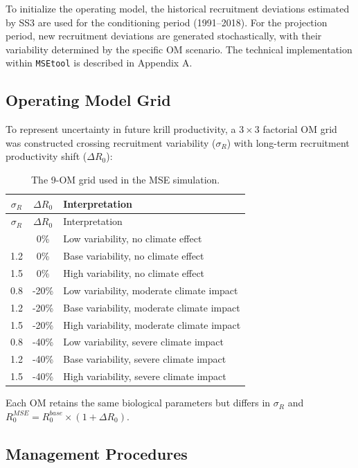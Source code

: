 \documentclass[
]{article}
\begin{document}
To initialize the operating model, the historical recruitment deviations estimated by SS3 are used for the conditioning period (1991--2018). For the projection period, new recruitment deviations are generated stochastically, with their variability determined by the specific OM scenario. The technical implementation within \texttt{MSEtool} is described in Appendix A.

\hypertarget{operating-model-grid}{%
\subsection{Operating Model Grid}\label{operating-model-grid}}

To represent uncertainty in future krill productivity, a \(3 \times 3\) factorial OM grid was constructed crossing recruitment variability (\(\sigma_R\)) with long-term recruitment productivity shift (\(\Delta R_0\)):

\begin{longtable}[]{@{}ccl@{}}
\caption{The 9-OM grid used in the MSE simulation.}\tabularnewline
\toprule\noalign{}
\(\sigma_R\) & \(\Delta R_0\) & Interpretation \\
\midrule\noalign{}
\endfirsthead
\toprule\noalign{}
\(\sigma_R\) & \(\Delta R_0\) & Interpretation \\
\midrule\noalign{}
\endhead
\bottomrule\noalign{}
\endlastfoot
0.8 & 0\% & Low variability, no climate effect \\
1.2 & 0\% & Base variability, no climate effect \\
1.5 & 0\% & High variability, no climate effect \\
0.8 & -20\% & Low variability, moderate climate impact \\
1.2 & -20\% & Base variability, moderate climate impact \\
1.5 & -20\% & High variability, moderate climate impact \\
0.8 & -40\% & Low variability, severe climate impact \\
1.2 & -40\% & Base variability, severe climate impact \\
1.5 & -40\% & High variability, severe climate impact \\
\end{longtable}

Each OM retains the same biological parameters but differs in \(\sigma_R\) and \(R_0^{MSE} = R_0^{base} \times (1 + \Delta R_0)\).

\hypertarget{management-procedures}{%
\subsection{Management Procedures}\label{management-procedures}}
\end{document}
